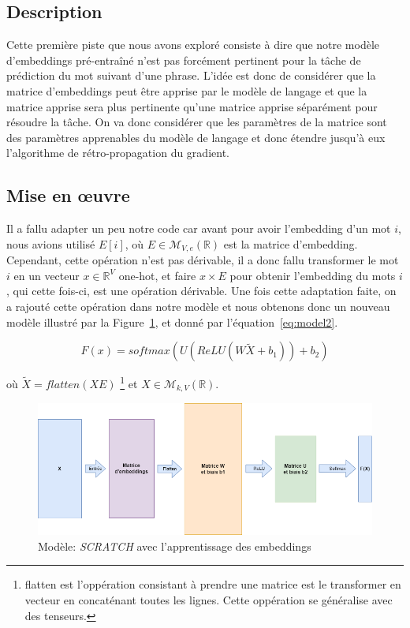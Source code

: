 \documentclass[a4paper]{article}
\begin{document}
\subsection{Description}

Cette première piste que nous avons exploré consiste à dire que notre modèle d'embeddings pré-entraîné n'est pas forcément 
pertinent pour la tâche de prédiction du mot suivant d'une phrase. L'idée est donc de considérer que la matrice d'embeddings 
peut être apprise par le modèle de langage et que la matrice apprise sera plus pertinente qu'une matrice apprise séparément pour 
résoudre la tâche. On va donc considérer que les paramètres de la matrice sont des paramètres apprenables du modèle de langage et 
donc étendre jusqu'à eux l'algorithme de rétro-propagation du gradient.

\subsection{Mise en \oe uvre}

Il a fallu adapter un peu notre code car avant pour avoir l'embedding d'un mot $i$, nous avions utilisé $E[i]$, où 
$E \in \mathcal{M}_{V, e}(\mathbb{R})$ est la matrice d'embedding. Cependant, cette opération n'est pas dérivable, il a donc
fallu transformer le mot $i$ en un vecteur $x \in \mathbb{R}^V$ one-hot, et faire $x \times E$ pour obtenir l'embedding du 
mots $i$, qui cette fois-ci, est une opération dérivable. 
Une fois cette adaptation faite, on a rajouté cette opération dans notre modèle et nous obtenons donc un nouveau modèle illustré 
par la Figure~\ref{fig:model2}, et donné par l'équation~\ref{eq:model2}.


\begin{equation}
  F(x)=softmax(U(ReLU(W\tilde{X}+b_1))+b_2)
  \label{eq:model2}
\end{equation}

où $\tilde{X}=flatten(XE)$
\footnote{flatten est l'oppération consistant à prendre une matrice est le transformer en vecteur en concaténant toutes les lignes. Cette
oppération se généralise avec des tenseurs.} 
et $X \in \mathcal{M}_{k, V}(\mathbb{R})$.



\begin{figure}[ht]
    \centering
    \includegraphics[width=0.60\linewidth]{model2.png}
    \caption{Modèle: \textit{SCRATCH} avec l'apprentissage des embeddings}
    \label{fig:model2}
\end{figure}
\end{document}
